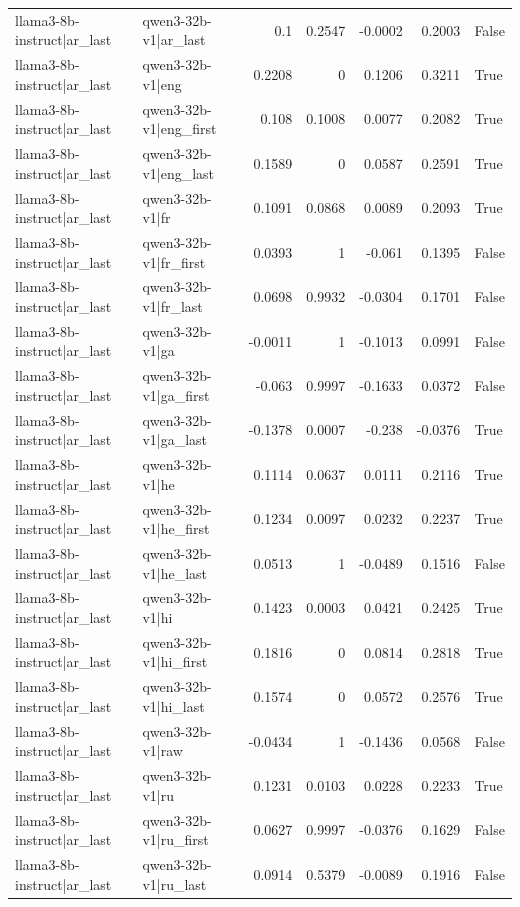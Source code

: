 \begin{table}
\begin{tabular}{l l r r r r l}
llama3-8b-instruct|ar_last & qwen3-32b-v1|ar_last & 0.1 & 0.2547 & -0.0002 & 0.2003 & False \\
llama3-8b-instruct|ar_last & qwen3-32b-v1|eng & 0.2208 & 0 & 0.1206 & 0.3211 & True \\
llama3-8b-instruct|ar_last & qwen3-32b-v1|eng_first & 0.108 & 0.1008 & 0.0077 & 0.2082 & True \\
llama3-8b-instruct|ar_last & qwen3-32b-v1|eng_last & 0.1589 & 0 & 0.0587 & 0.2591 & True \\
llama3-8b-instruct|ar_last & qwen3-32b-v1|fr & 0.1091 & 0.0868 & 0.0089 & 0.2093 & True \\
llama3-8b-instruct|ar_last & qwen3-32b-v1|fr_first & 0.0393 & 1 & -0.061 & 0.1395 & False \\
llama3-8b-instruct|ar_last & qwen3-32b-v1|fr_last & 0.0698 & 0.9932 & -0.0304 & 0.1701 & False \\
llama3-8b-instruct|ar_last & qwen3-32b-v1|ga & -0.0011 & 1 & -0.1013 & 0.0991 & False \\
llama3-8b-instruct|ar_last & qwen3-32b-v1|ga_first & -0.063 & 0.9997 & -0.1633 & 0.0372 & False \\
llama3-8b-instruct|ar_last & qwen3-32b-v1|ga_last & -0.1378 & 0.0007 & -0.238 & -0.0376 & True \\
llama3-8b-instruct|ar_last & qwen3-32b-v1|he & 0.1114 & 0.0637 & 0.0111 & 0.2116 & True \\
llama3-8b-instruct|ar_last & qwen3-32b-v1|he_first & 0.1234 & 0.0097 & 0.0232 & 0.2237 & True \\
llama3-8b-instruct|ar_last & qwen3-32b-v1|he_last & 0.0513 & 1 & -0.0489 & 0.1516 & False \\
llama3-8b-instruct|ar_last & qwen3-32b-v1|hi & 0.1423 & 0.0003 & 0.0421 & 0.2425 & True \\
llama3-8b-instruct|ar_last & qwen3-32b-v1|hi_first & 0.1816 & 0 & 0.0814 & 0.2818 & True \\
llama3-8b-instruct|ar_last & qwen3-32b-v1|hi_last & 0.1574 & 0 & 0.0572 & 0.2576 & True \\
llama3-8b-instruct|ar_last & qwen3-32b-v1|raw & -0.0434 & 1 & -0.1436 & 0.0568 & False \\
llama3-8b-instruct|ar_last & qwen3-32b-v1|ru & 0.1231 & 0.0103 & 0.0228 & 0.2233 & True \\
llama3-8b-instruct|ar_last & qwen3-32b-v1|ru_first & 0.0627 & 0.9997 & -0.0376 & 0.1629 & False \\
llama3-8b-instruct|ar_last & qwen3-32b-v1|ru_last & 0.0914 & 0.5379 & -0.0089 & 0.1916 & False \\

\end{tabular}
\end{table}
